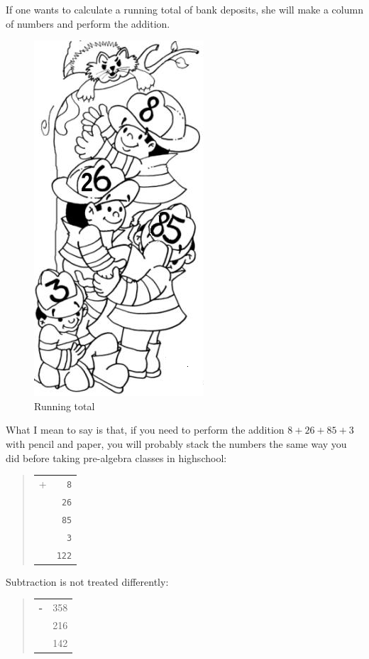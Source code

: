 \documentclass[a4paper,12pt]{book}
\begin{document}
If one wants to calculate a running
total of bank deposits, she will make
a column of numbers and perform the
addition.

\begin{figure}
\renewcommand\figurename{Fig.}
\includegraphics[scale=0.5]{figs-prefix/firemen.png}
\caption{Running total}
\end{figure}
What I mean to say is that, if you
need to perform the addition
$8 + 26 + 85 + 3$ with pencil and paper,
you will probably stack the numbers the
same way you did before taking pre-algebra
classes in highschool:
\begin{quote}
\begin{tabular}{p{0.5cm}p{1cm}}
+ &\verb|  8|\\
&\verb| 26|\\
&\verb| 85|\\
&\verb|  3|\\
\hline
&\verb|122|
\end{tabular}
\end{quote}
Subtraction is not treated differently:
\begin{quote}
\begin{tabular}{p{0.5cm}p{1.5cm}}
\Large\bf -&   358\\
&   216\\
\hline
& 142
\end{tabular}
\end{quote}
\end{document}

